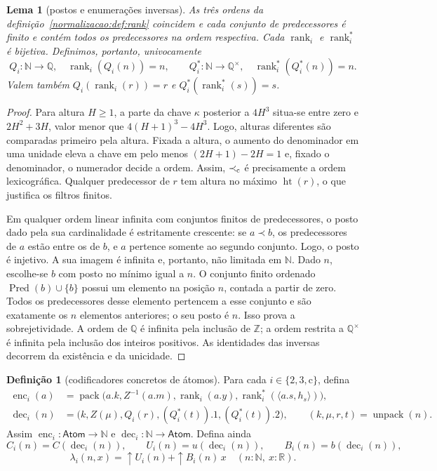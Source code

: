 \documentclass[12pt,a4paper]{article}
\theoremstyle{preciso}
\newtheorem{lema}[teorema]{Lema}
\theoremstyle{definition}
\newtheorem{definicao}[teorema]{Definição}
\newcommand{\N}{\mathbb N}
\newcommand{\Z}{\mathbb Z}
\newcommand{\Q}{\mathbb Q}
\newcommand{\R}{\mathbb R}
\newcommand{\Atoms}{\mathsf{Atom}}
\newcommand{\htq}{\operatorname{ht}}
\newcommand{\dec}{\operatorname{dec}}
\newcommand{\enc}{\operatorname{enc}}
\newcommand{\pred}{\operatorname{Pred}}
\newcommand{\rankq}{\operatorname{rank}}
\newcommand{\qstar}{\Q^{\times}}
\theoremstyle{preciso}
\theoremstyle{preciso}
\theoremstyle{preciso}
\theoremstyle{preciso}
\theoremstyle{definition}
\theoremstyle{preciso}
\theoremstyle{definition}
\theoremstyle{preciso}
\theoremstyle{preciso}
\theoremstyle{definition}
\begin{document}
\begin{lema}[postos e enumerações inversas]\label{map:normalizacao:4.5}\label{normalizacao:lem:rank}
As três ordens da definição~\ref{normalizacao:def:rank} coincidem e cada conjunto
de predecessores é finito e contém todos os predecessores na ordem
respectiva. Cada $\rankq_i$ e $\rankq_i^*$ é bijetiva.
Definimos, portanto, univocamente
\[
 Q_i:\N\to\Q,\quad\rankq_i(Q_i(n))=n,
 \qquad Q_i^*:\N\to\qstar,\quad\rankq_i^*(Q_i^*(n))=n.
\]
Valem também $Q_i(\rankq_i(r))=r$ e
$Q_i^*(\rankq_i^*(s))=s$.
\end{lema}
\begin{proof}
Para altura $H\ge1$, a parte da chave $\kappa$ posterior a $4H^3$
situa-se entre zero e $2H^2+3H$, valor menor que
$4(H+1)^3-4H^3$. Logo, alturas diferentes são comparadas primeiro
pela altura. Fixada a altura, o aumento do denominador em uma unidade eleva
a chave em pelo menos $(2H+1)-2H=1$ e, fixado o denominador, o
numerador decide a ordem. Assim, $\prec_{\rm c}$ é precisamente a
ordem lexicográfica. Qualquer predecessor de $r$ tem altura no
máximo $\htq(r)$, o que justifica os filtros finitos.

Em qualquer ordem linear infinita com conjuntos finitos de
predecessores, o posto dado pela sua cardinalidade é estritamente
crescente: se $a\prec b$, os predecessores de $a$ estão entre os de
$b$, e $a$ pertence somente ao segundo conjunto. Logo, o posto é
injetivo. A sua imagem é infinita e, portanto, não limitada em $\N$.
Dado $n$, escolhe-se $b$ com posto no mínimo igual a $n$. O conjunto finito
ordenado $\pred(b)\cup\{b\}$ possui um elemento na posição $n$,
contada a partir de zero. Todos os predecessores desse elemento
pertencem a esse conjunto e são exatamente os $n$ elementos
anteriores; o seu posto é $n$. Isso prova a sobrejetividade.
A ordem de $\Q$ é infinita pela inclusão de $\Z$; a ordem restrita a
$\qstar$ é infinita pela inclusão dos inteiros positivos.
As identidades das inversas decorrem da existência e da unicidade.
\end{proof}

\begin{definicao}[codificadores concretos de átomos]\label{map:normalizacao:4.6}\label{normalizacao:def:codec}
Para cada $i\in\{2,3,\mathrm c\}$, defina
\begin{align*}
 \enc_i(a)&=\operatorname{pack}
    \bigl(a.k,Z^{-1}(a.m),\rankq_i(a.y),
                     \rankq_i^*(\langle a.s,h_s\rangle)\bigr),\\
 \dec_i(n)&=
 \bigl(k,Z(\mu),Q_i(r),(Q_i^*(t)).1,(Q_i^*(t)).2\bigr),
 \qquad (k,\mu,r,t)=\operatorname{unpack}(n).
\end{align*}
Assim $\enc_i:\Atoms\to\N$ e $\dec_i:\N\to\Atoms$.
Defina ainda
\[
 C_i(n)=C(\dec_i(n)),\qquad
 U_i(n)=u(\dec_i(n)),\qquad B_i(n)=b(\dec_i(n)),
\]
\[
 \lambda_i(n,x)=\uparrow U_i(n)+\uparrow B_i(n)\,x
 \quad(n:\N,\ x:\R).
\]
\end{definicao}
\end{document}
